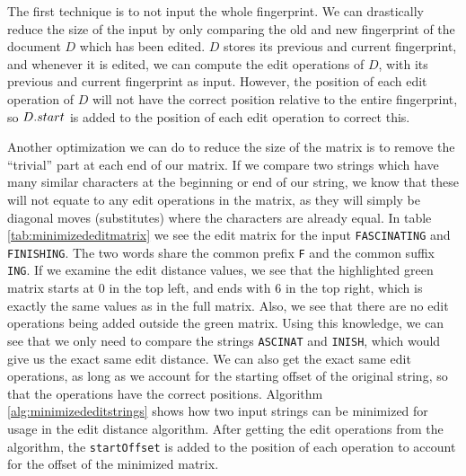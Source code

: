 The first technique is to not input the whole fingerprint. We can drastically reduce the
size of the input by only comparing the old and new fingerprint of the document $D$ which
has been edited. $D$ stores its previous and current fingerprint, and whenever it is
edited, we can compute the edit operations of $D$, with its previous and current
fingerprint as input. However, the position of each edit operation of $D$ will not have
the correct position relative to the entire fingerprint, so ${{D}.{start}}$ is
added to the position of each edit operation to correct this.

Another optimization we can do to reduce the size of the matrix is to remove the
``trivial'' part at each end of our matrix. If we compare two strings which have many
similar characters at the beginning or end of our string, we know that these will not
equate to any edit operations in the matrix, as they will simply be diagonal moves
(substitutes) where the characters are already equal. In table
\ref{tab:minimizededitmatrix} we see the edit matrix for the input \verb|FASCINATING| and
\verb|FINISHING|. The two words share the common prefix \verb|F| and the common suffix
\verb|ING|. If we examine the edit distance values, we see that the highlighted green
matrix starts at $0$ in the top left, and ends with $6$ in the top right, which is exactly
the same values as in the full matrix. Also, we see that there are no edit operations
being added outside the green matrix. Using this knowledge, we can see that we only need
to compare the strings \verb|ASCINAT| and \verb|INISH|, which would give us the exact same
edit distance. We can also get the exact same edit operations, as long as we account for
the starting offset of the original string, so that the operations have the correct
positions. Algorithm \ref{alg:minimizededitstrings} shows how two input strings can be
minimized for usage in the edit distance algorithm. After getting the edit operations from
the algorithm, the \verb|startOffset| is added to the position of each operation to
account for the offset of the minimized matrix.

